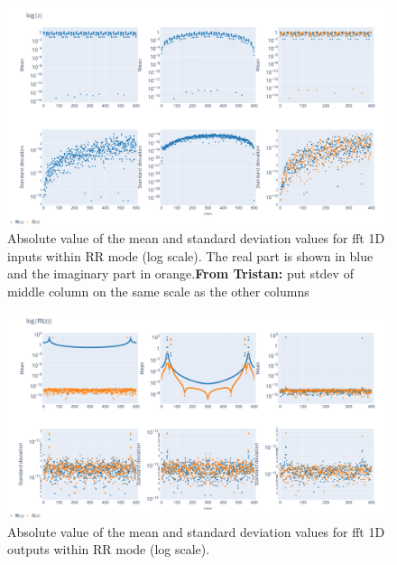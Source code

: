 \documentclass[11pt]{article}
\newcommand{\tristan}[1]{\color{orange}\textbf{From Tristan:} #1\color{black}\xspace}
\begin{document}
\begin{figure}
    \centering
    \includegraphics[width=\linewidth]{figure/FFT/fft_x.pdf}
    \caption{Absolute value of the mean and standard deviation values for 
    fft 1D inputs within RR mode (log scale). The real part is shown in blue and the imaginary part in orange.\tristan{put stdev of middle column on the same scale as the other columns}}
    \label{fig:fft1D_inputs}
\end{figure}

\begin{figure}
    \centering
    \includegraphics[width=\linewidth]{figure/FFT/fft_y.pdf}
    \caption{Absolute value of the mean and standard deviation values 
    for fft 1D outputs within RR mode (log scale).}
    \label{fig:fft1D_outputs}
\end{figure}
\end{document}
